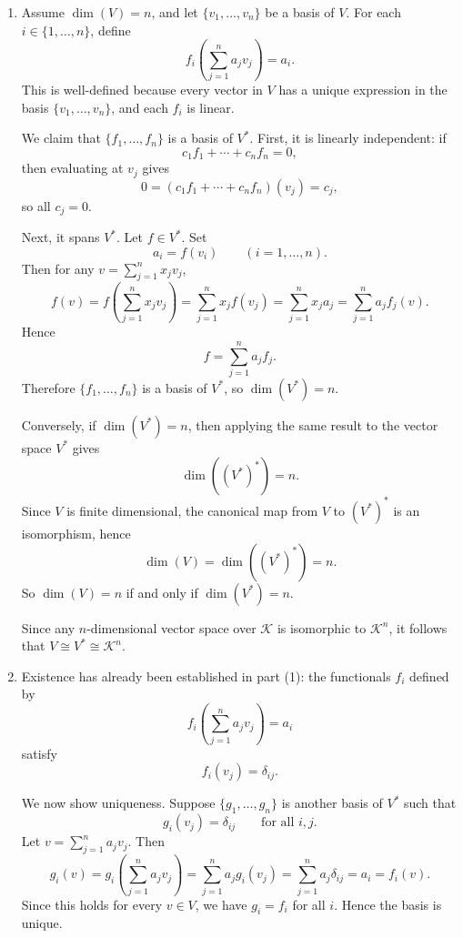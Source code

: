     \begin{proofenv}
    \leavevmode
    \begin{enumerate}
        \item Assume $\dim(V)=n$, and let $\{v_1,\dots,v_n\}$ be a basis of $V$. For each $i\in\{1,\dots,n\}$, define
        \[
        f_i\!\left(\sum_{j=1}^n a_jv_j\right)=a_i.
        \]
        This is well-defined because every vector in $V$ has a unique expression in the basis $\{v_1,\dots,v_n\}$, and each $f_i$ is linear.

        We claim that $\{f_1,\dots,f_n\}$ is a basis of $V^*$. First, it is linearly independent: if
        \[
        c_1f_1+\cdots+c_nf_n=0,
        \]
        then evaluating at $v_j$ gives
        \[
        0=(c_1f_1+\cdots+c_nf_n)(v_j)=c_j,
        \]
        so all $c_j=0$.

        Next, it spans $V^*$. Let $f\in V^*$. Set
        \[
        a_i=f(v_i)\qquad (i=1,\dots,n).
        \]
        Then for any $v=\displaystyle\sum_{j=1}^n x_jv_j$,
        \[
        f(v)
        =
        f\!\left(\sum_{j=1}^n x_jv_j\right)
        =
        \sum_{j=1}^n x_jf(v_j)
        =
        \sum_{j=1}^n x_ja_j
        =
        \sum_{j=1}^n a_jf_j(v).
        \]
        Hence
        \[
        f=\sum_{j=1}^n a_jf_j.
        \]
        Therefore $\{f_1,\dots,f_n\}$ is a basis of $V^*$, so $\dim(V^*)=n$.

        Conversely, if $\dim(V^*)=n$, then applying the same result to the vector space $V^*$ gives
        \[
        \dim((V^*)^*)=n.
        \]
        Since $V$ is finite dimensional, the canonical map from $V$ to $(V^*)^*$ is an isomorphism, hence
        \[
        \dim(V)=\dim((V^*)^*)=n.
        \]
        So $\dim(V)=n$ if and only if $\dim(V^*)=n$.

        Since any $n$-dimensional vector space over $\mathcal{K}$ is isomorphic to $\mathcal{K}^n$, it follows that $V\cong V^*\cong \mathcal{K}^n$.

        \item Existence has already been established in part (1): the functionals $f_i$ defined by
        \[
        f_i\!\left(\sum_{j=1}^n a_jv_j\right)=a_i
        \]
        satisfy
        \[
        f_i(v_j)=\delta_{ij}.
        \]

        We now show uniqueness. Suppose $\{g_1,\dots,g_n\}$ is another basis of $V^*$ such that
        \[
        g_i(v_j)=\delta_{ij}
        \qquad
        \text{for all } i,j.
        \]
        Let $v=\displaystyle \sum_{j=1}^n a_jv_j$. Then
        \[
        g_i(v)
        =
        g_i\!\left(\sum_{j=1}^n a_jv_j\right)
        =
        \sum_{j=1}^n a_jg_i(v_j)
        =
        \sum_{j=1}^n a_j\delta_{ij}
        =
        a_i
        =
        f_i(v).
        \]
        Since this holds for every $v\in V$, we have $g_i=f_i$ for all $i$. Hence the basis is unique.


\end{enumerate}
\end{proofenv}
